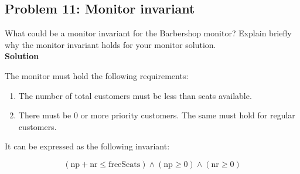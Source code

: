 \subsection{Problem 11: Monitor invariant}

What could be a monitor invariant for the Barbershop monitor? 
Explain briefly why the monitor invariant holds for your monitor solution. \\

\textbf{Solution}

The monitor must hold the following requirements: 
\begin{enumerate}
    \item The number of total customers must be less than seats available. 
    \item There must be 0 or more priority customers. The same must hold for regular customers. 
\end{enumerate}

It can be expressed as the following invariant: 

\[    (\text{np} + \text{nr} \leq \text{freeSeats}) \land (\text{np} \geq 0) \land (\text{nr} \geq 0) \]